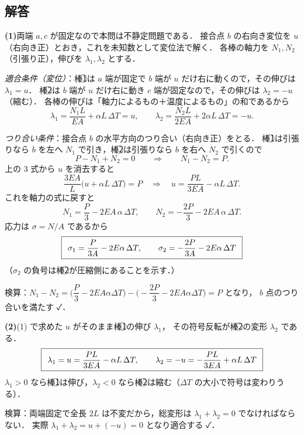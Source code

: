 \documentclass[11pt,a4paper]{article}
\begin{document}
\subsection*{解答}

\noindent\textbf{(1)}\quad 両端 $a,c$ が固定なので本問は不静定問題である．
接合点 $b$ の右向き変位を $u$（右向き正）とおき，これを未知数として変位法で解く．
各棒の軸力を $N_1,N_2$（引張り正），伸びを $\lambda_1,\lambda_2$ とする．

\medskip
\noindent\textit{適合条件（変位）}：棒\textcircled{1}は $a$ 端が固定で $b$ 端が $u$ だけ右に動くので，その伸びは $\lambda_1=u$．
棒\textcircled{2}は $b$ 端が $u$ だけ右に動き $c$ 端が固定なので，その伸びは $\lambda_2=-u$（縮む）．
各棒の伸びは「軸力によるもの＋温度によるもの」の和であるから
\[
  \lambda_1 = \frac{N_1 L}{EA} + \alpha L\,\Delta T = u,
  \qquad
  \lambda_2 = \frac{N_2 L}{2EA} + 2\alpha L\,\Delta T = -u .
\]

\noindent\textit{つり合い条件}：接合点 $b$ の水平方向のつり合い（右向き正）をとる．
棒\textcircled{1}は引張りなら $b$ を左へ $N_1$ で引き，棒\textcircled{2}は引張りなら $b$ を右へ $N_2$ で引くので
\[
  P - N_1 + N_2 = 0 \qquad\Longrightarrow\qquad N_1 - N_2 = P .
\]
上の 3 式から $u$ を消去すると
\[
  \frac{3EA}{L}\Big(u + \alpha L\,\Delta T\Big) = P
  \quad\Longrightarrow\quad
  u = \frac{PL}{3EA} - \alpha L\,\Delta T .
\]
これを軸力の式に戻すと
\[
  N_1 = \frac{P}{3} - 2EA\,\alpha\,\Delta T,
  \qquad
  N_2 = -\frac{2P}{3} - 2EA\,\alpha\,\Delta T .
\]
応力は $\sigma=N/A$ であるから
\[
  \boxed{\,\;\sigma_1 = \frac{P}{3A} - 2E\alpha\,\Delta T,\qquad
        \sigma_2 = -\frac{2P}{3A} - 2E\alpha\,\Delta T\;\,}
\]
（$\sigma_2$ の負号は棒\textcircled{2}が圧縮側にあることを示す．）

\smallskip
検算：$N_1-N_2=\Big(\dfrac{P}{3}-2EA\alpha\Delta T\Big)-\Big(-\dfrac{2P}{3}-2EA\alpha\Delta T\Big)=P$ となり，
$b$ 点のつり合いを満たす ✓．

\medskip
\noindent\textbf{(2)}\quad (1) で求めた $u$ がそのまま棒\textcircled{1}の伸び $\lambda_1$，
その符号反転が棒\textcircled{2}の変形 $\lambda_2$ である．
\[
  \boxed{\,\;\lambda_1 = u = \frac{PL}{3EA} - \alpha L\,\Delta T,\qquad
        \lambda_2 = -u = -\frac{PL}{3EA} + \alpha L\,\Delta T\;\,}
\]
$\lambda_1>0$ なら棒\textcircled{1}は伸び，$\lambda_2<0$ なら棒\textcircled{2}は縮む（$\Delta T$ の大小で符号は変わりうる）．

\smallskip
検算：両端固定で全長 $2L$ は不変だから，総変形は $\lambda_1+\lambda_2=0$ でなければならない．
実際 $\lambda_1+\lambda_2=u+(-u)=0$ となり適合する ✓．
\end{document}
